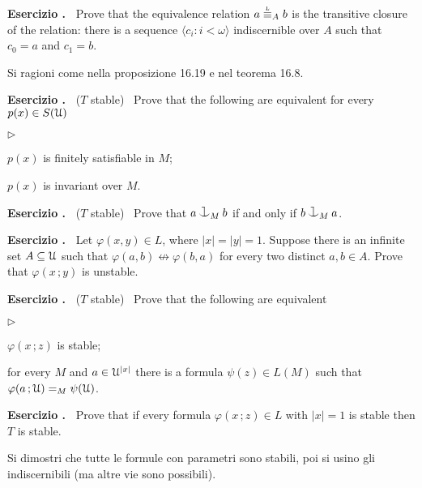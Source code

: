 \documentclass[10pt]{article}
\def\U{\EuScript U}
\def\niff{\nleftrightarrow}
\def\<{\langle}
\def\>{\rangle}
\def\cnonfork{\mathbin{\raise1.8ex\rlap{\kern0.6ex\rule{0.6ex}{0.1ex}}\rlap{\kern1.1ex\rule{0.1ex}{1.9ex}}\raise-0.3ex\hbox{$\smile$} } }
\newcommand{\labella}[1]{{\sf\footnotesize #1}\hfill}
\renewenvironment{itemize}
  {\begin{list}{$\triangleright$}{%
   \setlength{\parskip}{0mm}
   \setlength{\topsep}{0mm}
   \setlength{\rightmargin}{0mm}
   \setlength{\listparindent}{0mm}
   \setlength{\itemindent}{0mm}
   \setlength{\labelwidth}{3ex}
   \setlength{\itemsep}{0mm}
   \setlength{\parsep}{0mm}
   \setlength{\partopsep}{0mm}
   \setlength{\labelsep}{1ex}
   \setlength{\leftmargin}{\labelwidth+\labelsep}
   \let\makelabel\labella}}{%
  \end{list}}
\newcounter{ex}
\newenvironment{exercise}{\bigskip\addtocounter{ex}{1}\textbf{Esercizio \theex.\ }}{}
\begin{document}
\begin{exercise}
  Prove that the equivalence relation $a\stackrel{\smash{\scalebox{.5}{\rm L}}}{\equiv}_Ab$ is the transitive closure of the relation: there is a sequence $\<c_i:i<\omega\>$ indiscernible over $A$ such that $c_0=a$ and $c_1=b$.

  Si ragioni come nella proposizione 16.19 e nel teorema 16.8.
\end{exercise}


\begin{exercise}
  ($T$ stable) \  Prove that the following are equivalent for every $p(x)\in S(\U)$
  \begin{itemize}
    \item[1.] $p(x)$ is finitely satisfiable in $M$;
    \item[2.] $p(x)$ is invariant over $M$.
  \end{itemize}
\end{exercise}


\begin{exercise}
  ($T$ stable) \ 
  Prove that $a\cnonfork_M b$ if and only if $b\cnonfork_M a$.
\end{exercise}

\hfill\hrulefill\hfill\hfill

\begin{exercise}
  Let $\varphi(x,y)\in  L$, where $|x|=|y|=1$.
  Suppose there is an infinite set $A\subseteq\U$ such that $\varphi(a,b)\niff\varphi(b,a)$ for every two distinct $a,b\in A$.
  Prove that $\varphi(x\,;y)$ is unstable.
\end{exercise}

\begin{exercise}
  ($T$ stable) \ 
  Prove that the following are equivalent
  \begin{itemize}
    \item[1.] $\varphi(x\,;z)$ is stable;
    \item[2.] for every $M$ and $a\in\U^{|x|}$ there is a formula $\psi(z)\in L(M)$ such that $\varphi(a\,;\U)=_M\psi(\U)$.
  \end{itemize} 
\end{exercise}

\begin{exercise}
  Prove that if every formula $\varphi(x\,;z)\in L$ with $|x|=1$ is stable then $T$ is stable. 
  
  Si dimostri che tutte le formule con parametri sono stabili, poi si usino gli indiscernibili (ma altre vie sono possibili). 
\end{exercise}
\end{document}
